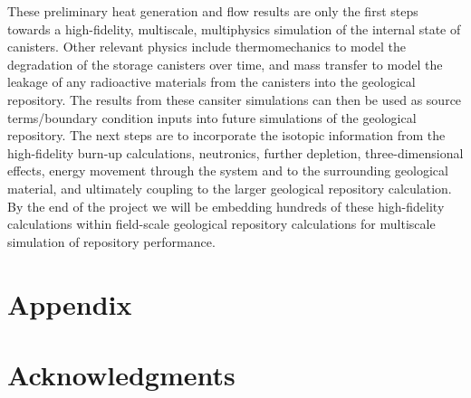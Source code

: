 \documentclass{anstrans}
\begin{document}
These preliminary heat generation and flow results are only the first steps towards a high-fidelity, multiscale, multiphysics simulation of the internal state of canisters.
Other relevant physics include thermomechanics to model the degradation of the storage canisters over time, and mass transfer to model the leakage of any radioactive materials from the canisters into the geological repository.
The results from these cansiter simulations can then be used as source terms/boundary condition inputs into future simulations of the geological repository.
The next steps are to incorporate the isotopic information from the high-fidelity burn-up calculations, neutronics, further depletion, three-dimensional effects, energy movement through the system and to the surrounding geological material, and ultimately coupling to the larger geological repository calculation.
By the end of the project we will be embedding hundreds of these high-fidelity calculations within field-scale geological repository calculations for multiscale simulation of repository performance. 

\appendix
\section{Appendix}

\section{Acknowledgments}



\end{document}
